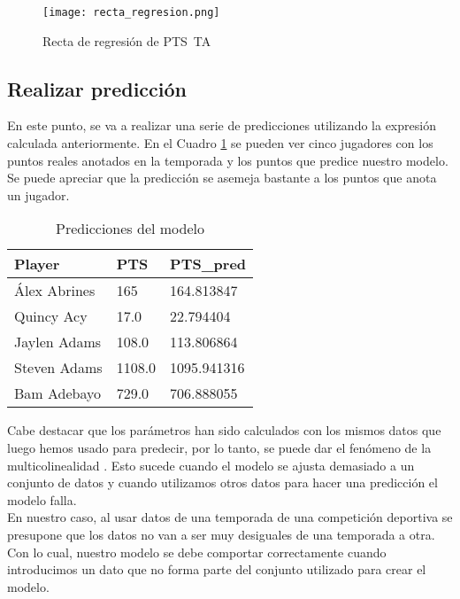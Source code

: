 \documentclass[11pt]{diazessay} %
\begin{document}
\begin{figure}[!h]
	\centering
	\texttt{[image: recta\_regresion.png]}
	\caption{Recta de regresión de PTS~TA}
	\label{fig:recta}
\end{figure}

\subsection*{Realizar predicción}
En este punto, se va a realizar una serie de predicciones utilizando la expresión calculada anteriormente. En el Cuadro \ref{pred} se pueden ver cinco jugadores con los puntos reales anotados en la temporada y los puntos que predice nuestro modelo. Se puede apreciar que la predicción se asemeja bastante a los puntos que anota un jugador. \\

\begin{table}[!h]
	\centering
	\begin{tabular}{|l|l|l|}
		\hline
		\textbf{Player} & \textbf{PTS} & \textbf{PTS\_pred} \\ \hline
		Álex Abrines    & 165          & 164.813847         \\ \hline
		Quincy Acy      & 17.0         & 22.794404          \\ \hline
		Jaylen Adams    & 108.0        & 113.806864         \\ \hline
		Steven Adams    & 1108.0       & 1095.941316        \\ \hline
		Bam Adebayo     & 729.0        & 706.888055         \\ \hline
	\end{tabular}
	\caption{Predicciones del modelo}
	\label{pred}
\end{table}

Cabe destacar que los parámetros han sido calculados con los mismos datos que luego hemos usado para predecir, por lo tanto, se puede dar el fenómeno de la multicolinealidad \cite{multicol}. Esto sucede cuando el modelo se ajusta demasiado a un conjunto de datos y cuando utilizamos otros datos para hacer una predicción el modelo falla. \\

En nuestro caso, al usar datos de una temporada de una competición deportiva se presupone que los datos no van a ser muy desiguales de una temporada a otra. Con lo cual, nuestro modelo se debe comportar correctamente cuando introducimos un dato que no forma parte del conjunto utilizado para crear el modelo.
\end{document}
